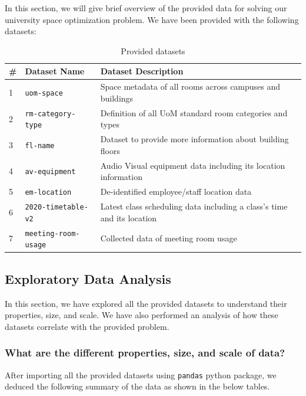In this section, we will give brief overview of the provided data for solving our university space optimization problem. We have been provided with the following datasets:

\begin{table}[H]
\centering
\begin{tabular}{|l|l|l|}
\hline
\# & \textbf{Dataset Name} & \textbf{Dataset Description}                                           \\ \hline
1  & \texttt{uom-space}             & Space metadata of all rooms across campuses and buildings              \\ \hline
2  & \texttt{rm-category-type}      & Definition of all UoM standard room categories and types               \\ \hline
3  & \texttt{fl-name}               & Dataset to provide more information about building floors              \\ \hline
4  & \texttt{av-equipment}         & Audio Visual equipment data including its location information         \\ \hline
5  & \texttt{em-location}           & De-identified employee/staff location data                             \\ \hline
6  & \texttt{2020-timetable-v2}     & Latest class scheduling data including a class's time and its location \\ \hline
7  & \texttt{meeting-room-usage}    & Collected data of meeting room usage                                   \\ \hline
\end{tabular}
\caption{Provided datasets}
\end{table}

\subsection{Exploratory Data Analysis}

In this section, we have explored all the provided datasets to understand their properties, size, and scale. We have also performed an analysis of how these datasets correlate with the provided problem.

\subsubsection{What are the different properties, size, and scale of data?}

After importing all the provided datasets using \texttt{pandas} python package, we deduced the following summary of the data as shown in the below tables.

